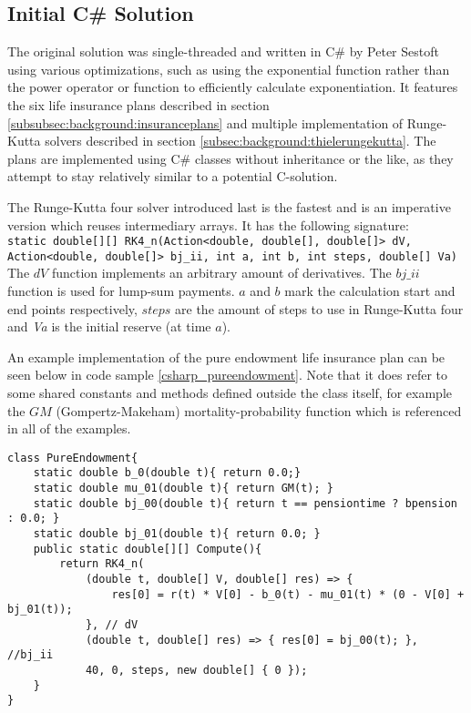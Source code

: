 \subsection{Initial C\# Solution}\label{subsec:initialsolution}
The original solution was single-threaded and written in C\# by Peter Sestoft using various optimizations, such as using the exponential function rather than the power operator or function to efficiently calculate exponentiation.
It features the six life insurance plans described in section \ref{subsubsec:background:insuranceplans} and multiple implementation of Runge-Kutta solvers described in section \ref{subsec:background:thielerungekutta}.
The plans are implemented using C\# classes without inheritance or the like, as they attempt to stay relatively similar to a potential C-solution.

The Runge-Kutta four solver introduced last is the fastest and is an imperative version which reuses intermediary arrays.
It has the following signature: \\
\lstinline$static double[][] RK4_n(Action<double, double[], double[]> dV, Action<double, double[]> bj_ii, int a, int b, int steps, double[] Va)$
\\
The $dV$ function implements an arbitrary amount of derivatives.
The $bj\_ii$ function is used for lump-sum payments.
$a$ and $b$ mark the calculation start and end points respectively, $steps$ are the amount of steps to use in Runge-Kutta four and \textit{Va} is the initial reserve (at time $a$).

An example implementation of the pure endowment life insurance plan can be seen below in code sample \ref{csharp_pureendowment}. 
Note that it does refer to some shared constants and methods defined outside the class itself, for example the $GM$ (Gompertz-Makeham) mortality-probability function which is referenced in all of the examples.
\clearpage
\begin{lstlisting}[language=CSharp, caption=The pure endowment insurance plan expressed in C\#, label=csharp_pureendowment]
class PureEndowment{
    static double b_0(double t){ return 0.0;}
    static double mu_01(double t){ return GM(t); }
    static double bj_00(double t){ return t == pensiontime ? bpension : 0.0; }
    static double bj_01(double t){ return 0.0; }
    public static double[][] Compute(){
        return RK4_n(
            (double t, double[] V, double[] res) => { 
                res[0] = r(t) * V[0] - b_0(t) - mu_01(t) * (0 - V[0] + bj_01(t)); 
            }, // dV
            (double t, double[] res) => { res[0] = bj_00(t); }, //bj_ii
            40, 0, steps, new double[] { 0 });
    }
}
\end{lstlisting}

